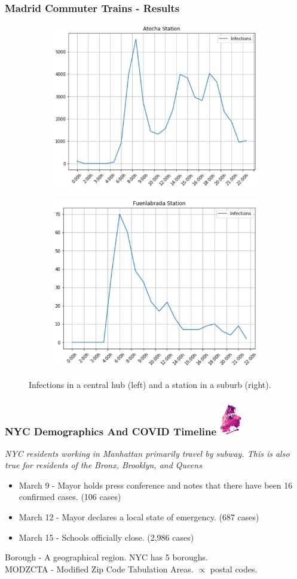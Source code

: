 \documentclass{beamer}
\begin{document}
\begin{frame}
\frametitle{Madrid Commuter Trains - Results}
\begin{figure}
	\centering
	\begin{subfigure}
		\centering
		\includegraphics[width=.4\linewidth]{Scratch_Visuals/madrid-infection-timeline-atocha.png}
	\end{subfigure}%
	\begin{subfigure}
		\centering
		\includegraphics[width=.4\linewidth]{Scratch_Visuals/madrid-infection-timeline-fuenlabrada.png}
	\end{subfigure}
	\caption{Infections in a central hub (left) and a station in a suburb (right).}
\end{figure}
\end{frame}
\begin{frame}
\frametitle{NYC Demographics And COVID Timeline
\includegraphics[width=1cm]{Scratch_Visuals/NYC_COVID_Case_Rate.png}
}
\textit{NYC residents working in Manhattan primarily travel by subway. This is
also true for residents of the Bronx, Brooklyn, and Queens\cite{nyc_commuting}}
\begin{itemize}
	\item March 9 - Mayor holds press conference and notes that there have been 16 confirmed cases. (106 cases)
	\item March 12 - Mayor declares a local state of emergency. (687 cases)
	\item March 15 - Schools officially close. (2,986 cases)
\end{itemize}
Borough - A geographical region. NYC has 5 boroughs. \\
MODZCTA - Modified Zip Code Tabulation Areas. $\propto$ postal codes.\\
\end{frame}
\end{document}
